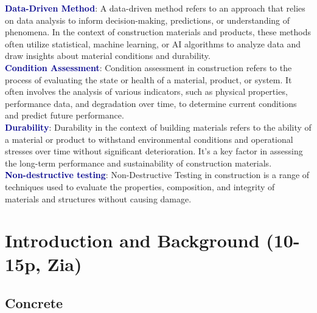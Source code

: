 \textbf{\textcolor{darkblue}{Data-Driven Method}}:
A data-driven method refers to an approach that relies on data analysis to inform decision-making, predictions, or understanding of phenomena. In the context of construction materials and products, these methods often utilize statistical, machine learning, or AI algorithms to analyze data and draw insights about material conditions and durability.\\

\textbf{\textcolor{darkblue}{Condition Assessment}}:
Condition assessment in construction refers to the process of evaluating the state or health of a material, product, or system. It often involves the analysis of various indicators, such as physical properties, performance data, and degradation over time, to determine current conditions and predict future performance.\\

\textbf{\textcolor{darkblue}{Durability}}:
Durability in the context of building materials refers to the ability of a material or product to withstand environmental conditions and operational stresses over time without significant deterioration. It's a key factor in assessing the long-term performance and sustainability of construction materials.\\

\textbf{\textcolor{darkblue}{Non-destructive testing}}:
Non-Destructive Testing in construction is a range of techniques used to evaluate the properties, composition, and integrity of materials and structures without causing damage.\\

\section{Introduction and Background (10-15p, Zia)}
\subsection{Concrete}

